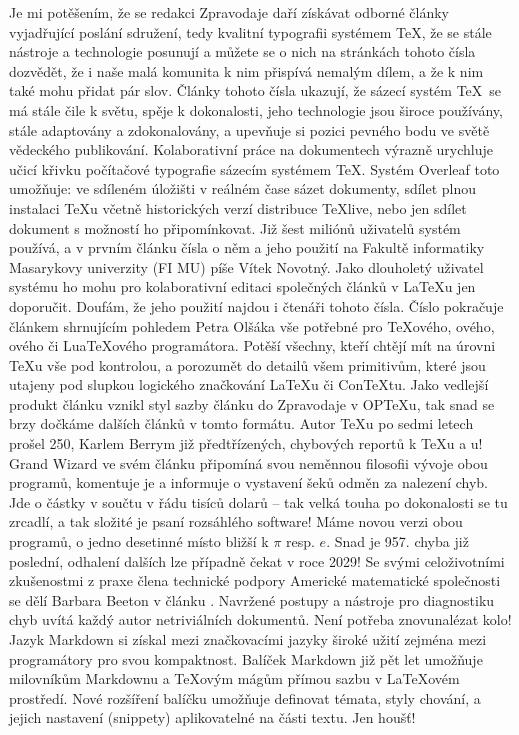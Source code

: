 Je mi potěšením, že se redakci Zpravodaje daří získávat odborné články vyjadřující poslání sdružení, tedy kvalitní typografii systémem \TeX, že se stále nástroje a technologie posunují a můžete se o nich na stránkách tohoto čísla dozvědět, že i naše malá komunita k nim přispívá nemalým dílem, a že k nim také mohu přidat pár slov.
Články tohoto čísla ukazují, že sázecí systém \TeX\ se má stále čile k světu, spěje k dokonalosti, jeho technologie jsou široce používány, stále adaptovány a zdokonalovány, a upevňuje si pozici pevného bodu ve světě vědeckého publikování.
Kolaborativní práce na dokumentech výrazně urychluje učicí křivku počítačové typografie sázecím systémem \TeX.  Systém Overleaf toto umožňuje: ve sdíleném úložišti v reálném čase sázet dokumenty, sdílet plnou instalaci \TeX u včetně historických verzí distribuce \TeX live, nebo jen sdílet dokument s možností ho připomínkovat.  Již šest miliónů uživatelů systém používá, a v prvním článku čísla o něm a jeho použití na Fakultě informatiky Masarykovy univerzity (FI MU) píše Vítek Novotný.  Jako dlouholetý uživatel systému ho mohu pro kolaborativní editaci společných článků v \LaTeX u jen doporučit.  Doufám, že jeho použití najdou i čtenáři tohoto čísla.
Číslo pokračuje článkem shrnujícím pohledem Petra Olšáka vše potřebné pro \TeX ového, \eTeX ového, \XeTeX ového či Lua\TeX ového programátora.  Potěší všechny, kteří chtějí mít na úrovni \TeX u vše pod kontrolou, a porozumět do detailů všem primitivům, které jsou utajeny pod slupkou logického značkování \LaTeX u či Con\TeX tu.  Jako vedlejší produkt článku vznikl styl sazby článku do Zpravodaje v OP\TeX u, tak snad se brzy dočkáme dalších článků v tomto formátu.
Autor \TeX u po sedmi letech prošel 250, Karlem Berrym již předtřízených, chybových reportů k \TeX u a \MF u!  Grand Wizard ve svém článku připomíná svou neměnnou filosofii vývoje obou programů, komentuje je a informuje o vystavení šeků odměn za nalezení chyb. Jde o částky v součtu v řádu tisíců dolarů -- tak velká touha po dokonalosti se tu zrcadlí, a tak složité je psaní rozsáhlého software!  Máme novou verzi obou programů, o jedno desetinné místo bližší k $\pi$ resp. $e$.  Snad je 957. chyba již poslední, odhalení dalších lze případně čekat v roce 2029!
Se svými celoživotními zkušenostmi z praxe člena technické podpory Americké matematické společnosti se dělí Barbara Beeton v článku .  Navržené postupy a nástroje pro diagnostiku chyb uvítá každý autor netriviálních dokumentů.  Není potřeba znovunalézat kolo!
Jazyk Markdown si získal mezi značkovacími jazyky široké užití zejména mezi programátory pro svou kompaktnost.  Balíček Markdown již pět let umožňuje milovníkům Markdownu a \TeX ovým mágům přímou sazbu v \LaTeX ovém prostředí.  Nové rozšíření balíčku umožňuje definovat témata, styly chování, a jejich nastavení (snippety) aplikovatelné na části textu. Jen houšť!
